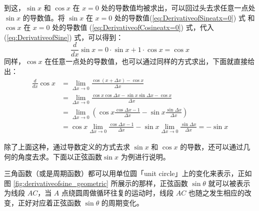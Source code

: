 \documentclass{ctexart}
\numberwithin{equation}{section}
\numberwithin{figure}{section}
\begin{document}
到这，\(\sin x\) 和 \(\cos x\) 在 \(x = 0\) 处的导数值均被求出，可以回过头去求任意一点处 \(\sin x\) 的导数值。将 \(\sin x\) 在 \(x = 0\) 处的导数值(\ref{eq:DerivativeofSineatx=0}) 式 和 \(\cos x\) 在 \(x = 0\) 处的导数值 (\ref{eq:DerivativeofCosineatx=0}) 式，代入 (\ref{eq:DerivativeofSine}) 式，可以得到：
\begin{equation}\label{eq:DerivativeofSine_final}
    \frac{d}{dx}\sin x = 0 \cdot \sin x + 1 \cdot \cos x = \cos x
\end{equation}
同样，\(\cos x\) 在任意一点处的导数值，也可以通过同样的方式求出，下面就直接给出：
\begin{equation}\label{eq:DerivativeofCosine}
    \begin{aligned}
        \frac{d}{dx}\cos x
         & = \lim\limits_{\Delta x \to 0}\frac{\cos(x + \Delta x) - \cos x}{\Delta x}                                                                          \\
         & = \lim\limits_{\Delta x \to 0}\frac{\cos x \cos\Delta x - \sin x\sin\Delta x  - \cos x}{\Delta x}                                                   \\
         & = \lim\limits_{\Delta x \to 0}\left(\cos x\frac{\cos \Delta x - 1}{\Delta x}- \sin x \frac{\sin \Delta x}{\Delta x}\right)                          \\
         & = \cos x\lim\limits_{\Delta x \to 0}\frac{\cos \Delta x - 1}{\Delta x} - \sin x\lim\limits_{\Delta x \to 0}\frac{\sin \Delta x}{\Delta x} = -\sin x
    \end{aligned}
\end{equation}

除了上面这种，通过导数定义的方式去求 \(\sin x\) 和 \(\cos x\) 的导数，还可以通过几何的角度去求。下面以正弦函数\(\sin x\) 为例进行说明。

三角函数（或是周期函数）都可以用单位圆「unit circle」上的变化来表示，正如图 \ref{fig:derivativeofsine_geometric} 所展示的那样，正弦函数 \(\sin \theta\) 就可以被表示为线段 \(AC\)，当 \(A\) 点绕圆周做循环往复的运动时，线段 \(AC\) 也随之发生相应的改变，正好对应着正弦函数 \(\sin \theta\) 的周期变化。
\end{document}
